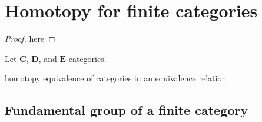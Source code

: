 \chapter{Homotopy for finite categories}

\begin{definition}
    
\end{definition}

\begin{definition}[Homotopy]
    
\end{definition}

\begin{theorem}
    
\end{theorem}

\begin{proof}
    here
\end{proof}

\begin{definition}
    
\end{definition}

\begin{lemma}
    Let \(\mathbf{C}\), \(\mathbf{D}\), and \(\mathbf{E} \) categories.
\end{lemma}


\begin{definition}
    
\end{definition}

\begin{theorem}
    homotopy equivalence of categories in an equivalence relation
\end{theorem}


\section{Fundamental group of a finite category}

